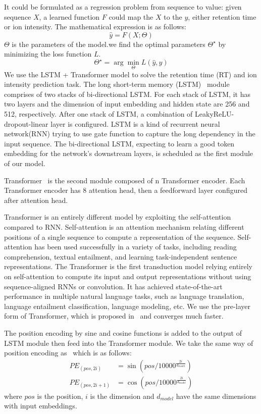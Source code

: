 
It could be formulated as a regression problem from sequence to value: given sequence \( X \), a learned
function \( F \) could map the \( X \) to the \( y \), either retention time or ion intensity. The mathematical expression is as follows:
\[ \hat{y} = F(X;\Theta) \]
$\Theta$ is the parameters of the model.we find the optimal parameters \( \Theta^\star\) by minimizing  the loss function \( L \).
\[ \Theta^\star = \arg\min_{\Theta} L(\hat{y}, y) \]
We use the LSTM + Transformer model to solve the retention time (RT) and ion intensity prediction task.
The long short-term memory (LSTM)~\cite{hochreiter1997long} module comprises of two stacks of bi-directional LSTM. For each stack of LSTM, it has two layers and the dimension of input embedding and hidden state are 256 and 512, respectively. After one stack of LSTM, a combination of LeakyReLU-dropout-linear layer is configured. LSTM is a kind of recurrent neural network(RNN) trying to use gate function to capture the long dependency in the input sequence. The bi-directional LSTM, expecting to learn a good token embedding for the network's downstream layers, is scheduled as the first module of our model.

Transformer~\cite{vaswani2017attention} is the second module composed of n Transformer encoder.
Each Transformer encoder has 8 attention head, then a feedforward layer configured after attention head.


Transformer is an entirely different model by exploiting the self-attention compared to RNN.
Self-attention is an attention mechanism relating different positions of a single sequence to compute a representation of the sequence. Self-attention has been used successfully in a variety of tasks, including reading
comprehension, textual entailment, and learning task-independent sentence representations.
The Transformer is the first transduction model relying entirely on self-attention to compute its input and output representations without using sequence-aligned RNNs or convolution. It has achieved state-of-the-art performance in multiple natural language tasks, such as language translation, language entailment classification, language modeling, etc. We use the pre-layer form of Transformer, which is proposed in~\cite{xiong2020layer} and converges much faster.

The position encoding by sine and cosine functions is added to the output of LSTM module then feed into the Transformer module.
We take the same way of position encoding as~\cite{vaswani2017attention} which is as follows:
\begin{align*}
    PE_{(pos, 2i)} &= \sin{(pos/10000^{\frac{2i}{d_{model}}})} \\
    PE_{(pos, 2i+1)} &= \cos{(pos/10000^{\frac{2i}{d_{model}}})}
\end{align*}
where $pos$  is the position, $i$ is the dimension and $d_{model}$ have the same dimensions with input embeddings.


